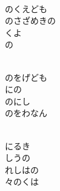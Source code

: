 \documentclass[10pt,b5j]{tarticle} %
\begin{document}
\begin{enumerate}
\begin{minipage}[c]{\blocksize}
    \end{minipage}
    \begin{minipage}[c]{\blocksize}
        
        \vspace{\linespace}
        \item~\\
        のくえども\\
        のさざめきの\\
        くよ\\
        の
        
    \end{minipage}
    \begin{minipage}[c]{\blocksize}
        
        \vspace{\linespace}
        \item~\\
        のをげども\\
        にの\\
        のにし\\
        のをわなん
        
    \end{minipage}
    \begin{minipage}[c]{\blocksize}
        
        \vspace{\linespace}
        \item~\\
        にるき\\
        しうの\\
        れしはの\\
        々のくは
    
    \end{minipage}
\end{enumerate} %
\end{document}
